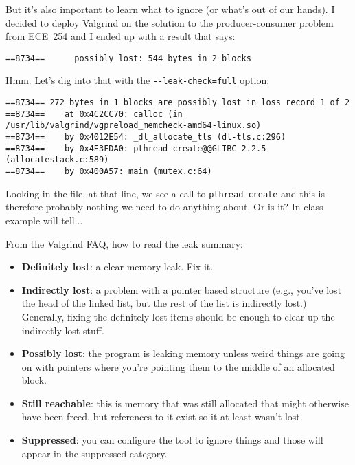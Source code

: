 But it's also important to learn what to ignore (or what's out of our hands). I decided to deploy Valgrind on the solution to the producer-consumer problem from ECE~254 and I ended up with a result that says:

\begin{lstlisting}
==8734==      possibly lost: 544 bytes in 2 blocks
\end{lstlisting}

Hmm. Let's dig into that with the \verb+--leak-check=full+ option:

\begin{lstlisting}
==8734== 272 bytes in 1 blocks are possibly lost in loss record 1 of 2
==8734==    at 0x4C2CC70: calloc (in /usr/lib/valgrind/vgpreload_memcheck-amd64-linux.so)
==8734==    by 0x4012E54: _dl_allocate_tls (dl-tls.c:296)
==8734==    by 0x4E3FDA0: pthread_create@@GLIBC_2.2.5 (allocatestack.c:589)
==8734==    by 0x400A57: main (mutex.c:64)
\end{lstlisting}

Looking in the file, at that line, we see a call to \texttt{pthread\_create} and this is therefore probably nothing we need to do anything about. Or is it? In-class example will tell...

From the Valgrind FAQ, how to read the leak summary:
\begin{itemize}
	\item \textbf{Definitely lost}: a clear memory leak. Fix it.
	\item \textbf{Indirectly lost}: a problem with a pointer based structure (e.g., you've lost the head of the linked list, but the rest of the list is indirectly lost.) Generally, fixing the definitely lost items should be enough to clear up the indirectly lost stuff.
	\item \textbf{Possibly lost}: the program is leaking memory unless weird things are going on with pointers where you're pointing them to the middle of an allocated block.
	\item \textbf{Still reachable}: this is memory that was still allocated that might otherwise have been freed, but references to it exist so it at least wasn't lost.
	\item \textbf{Suppressed}: you can configure the tool to ignore things and those will appear in the suppressed category.
\end{itemize}



